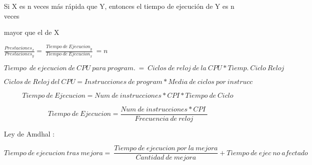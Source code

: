 \documentclass{article}
\begin{document}
Si X es n veces más rápida que Y, entonces el tiempo de ejecución de Y
es n veces

mayor que el de X

\(\frac{{Prestaciones}_{x}}{{Prestaciones}_{y}} = \ \frac{{Tiempo\ de\ Ejecucion}_{y}}{{Tiempo\ de\ Ejecucion}_{x}}\  = n\)

\[Tiempo\ \ de\ ejecucion\ de\ CPU\ para\ program.\  = \ Ciclos\ de\ reloj\ de\ la\ CPU*Tiemp.\ Ciclo\ Reloj\]

\[Ciclos\ de\ Reloj\ del\ CPU = Instrucciones\ de\ program*Media\ de\ ciclos\ por\ instrucc\]

\[Tiempo\ de\ Ejecucion = Num\ de\ instrucciones*CPI*Tiempo\ de\ Ciclo\]

\[Tiempo\ de\ Ejecucion = \frac{Num\ de\ instrucciones*CPI\ }{Frecuencia\ de\ reloj}\]

Ley de Amdhal :

\[Tiempo\ de\ ejecucion\ tras\ mejora = \ \frac{Tiempo\ de\ ejecucion\ por\ la\ mejora}{Cantidad\ de\ mejora} + Tiempo\ de\ ejec\ no\ afectado\]
\end{document}
